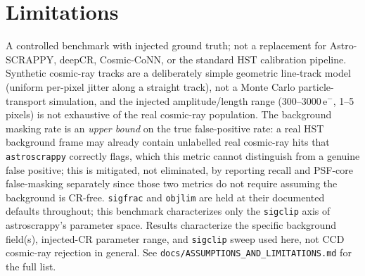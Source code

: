 \documentclass[11pt]{article}
\begin{document}
\section{Limitations}
\label{sec:limitations}
A controlled benchmark with injected ground truth; not a replacement for
Astro-SCRAPPY, deepCR, Cosmic-CoNN, or the standard HST calibration pipeline.
Synthetic cosmic-ray tracks are a deliberately simple geometric line-track
model (uniform per-pixel jitter along a straight track), not a Monte Carlo
particle-transport simulation, and the injected amplitude/length range
(300--3000\,e$^-$, 1--5 pixels) is not exhaustive of the real cosmic-ray
population. The background masking rate is an \emph{upper bound} on the true
false-positive rate: a real HST background frame may already contain
unlabelled real cosmic-ray hits that \texttt{astroscrappy} correctly flags,
which this metric cannot distinguish from a genuine false positive; this is
mitigated, not eliminated, by reporting recall and PSF-core false-masking
separately since those two metrics do not require assuming the background is
CR-free. \texttt{sigfrac} and \texttt{objlim} are held at their documented
defaults throughout; this benchmark characterizes only the \texttt{sigclip}
axis of astroscrappy's parameter space. Results characterize the specific
background field(s), injected-CR parameter range, and \texttt{sigclip} sweep
used here, not CCD cosmic-ray rejection in general. See
\texttt{docs/ASSUMPTIONS\_AND\_LIMITATIONS.md} for the full list.
\end{document}

